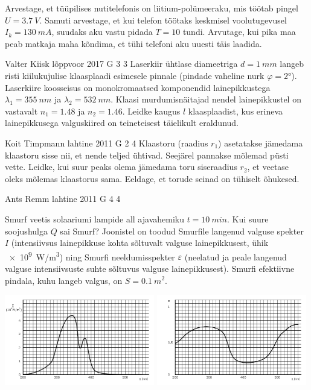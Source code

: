 \documentclass[11pt]{article}
\begin{document}
{{Arvestage, et tüüpilises nutitelefonis on liitium-polümeeraku, mis töötab pingel $U=\SI{3.7}{V}$. Samuti arvestage, et kui telefon töötaks keskmisel voolutugevusel $I_k=\SI{130}{mA}$, suudaks aku vastu pidada $T=10$ tundi. Arvutage, kui pika maa peab matkaja maha kõndima, et tühi telefoni aku uuesti täis laadida.
\fi
}

{Valter Kiisk} %
{lõppvoor} %
{2017} %
{G 3} %
{3} %
{
\ifStatement
Laserkiir ühtlase diameetriga $d=\SI{1}{mm}$ langeb risti kiilukujulise klaasplaadi esimesele pinnale (pindade vaheline nurk $\varphi=\ang{2}$). Laserkiire koosseisus on monokromaatsed komponendid lainepikkustega $\lambda_1=\SI{355}{nm}$ ja $\lambda_2=\SI{532}{nm}$. Klaasi murdumisnäitajad nendel lainepikkustel on vastavalt $n_1=\num{1.48}$ ja $n_2=\num{1.46}$. Leidke kaugus $l$ klaasplaadist, kus erineva lainepikkusega valguskiired on teineteisest täielikult eraldunud.
\fi
}

{Koit Timpmann} %
{lahtine} %
{2011} %
{G 2} %
{4} %
{
\ifStatement
Klaastoru (raadius $r_1$) asetatakse jämedama klaastoru sisse nii, et nende teljed ühtivad. Seejärel
pannakse mõlemad püsti vette. Leidke, kui suur peaks olema jämedama toru
siseraadius $r_2$, et veetase oleks mõlemas klaastorus sama. Eeldage, et torude
seinad on tühiselt õhukesed.
\fi
}

{Ants Remm} %
{lahtine} %
{2011} %
{G 4} %
{4} %
{
\ifStatement
Smurf veetis solaariumi lampide all ajavahemiku $t = \SI{10}{min} $. Kui suure soojushulga $ Q $
sai Smurf? Joonistel on toodud Smurfile langenud valguse spekter $I$
(intensiivsus lainepikkuse kohta sõltuvalt valguse lainepikkusest, ühik
\SI{e9}{W/m^3}) ning Smurfi	
neeldumisspekter $\varepsilon$ (neelatud ja peale langenud valguse
intensiivsuste suhte
sõltuvus valguse lainepikkusest).
Smurfi efektiivne pindala, kuhu langeb valgus, on $ S = \SI{0,1}{m^2} $.
\begin{center}
\includegraphics[width=0.49\textwidth]{2011-lahg-04-I}
\includegraphics[width=0.49\textwidth]{2011-lahg-04-epsilon}
\end{center}
\fi
}

}
\end{document}
